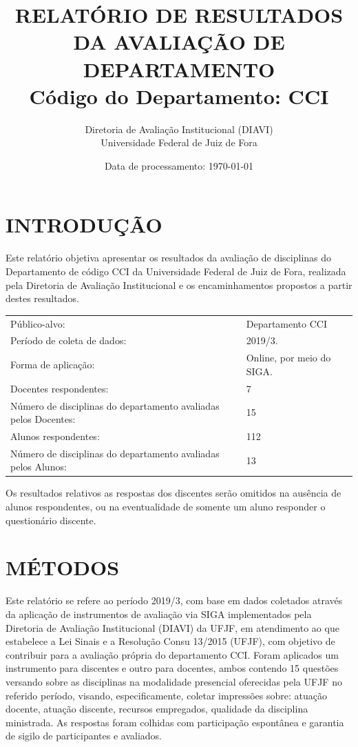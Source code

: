 \documentclass[a4paper,10pt]{article}
\date{Data de processamento: \today}
\begin{document}
\author{Diretoria de Avaliação Institucional (DIAVI) \\ Universidade Federal de Juiz de Fora}

\title{RELATÓRIO DE RESULTADOS DA AVALIAÇÃO DE DEPARTAMENTO\\ Código do Departamento: CCI}
\maketitle
\section{INTRODUÇÃO}
Este relatório objetiva apresentar os resultados da avaliação de disciplinas do Departamento     de código CCI da Universidade Federal de Juiz de Fora, realizada pela     Diretoria de Avaliação Institucional e os encaminhamentos propostos a     partir destes resultados.

\begin{center}
\begin{tabularx}{\linewidth}{X|l}

Público-alvo:& Departamento  CCI\\

Período de coleta de dados:& 2019/3.\\

Forma de aplicação:& Online, por meio do SIGA.\\

Docentes respondentes:& 7\\

Número de disciplinas do departamento avaliadas pelos Docentes:& 15\\

Alunos   respondentes:& 112\\

Número de disciplinas do departamento  avaliadas pelos   Alunos:& 13\\
\end{tabularx}
\end{center}

Os resultados relativos as respostas dos discentes serão omitidos na ausência de alunos respondentes, ou na eventualidade de somente um aluno responder o questionário discente.
\section{MÉTODOS}
Este relatório se refere ao período 2019/3, com base em dados     coletados através da aplicação de instrumentos de avaliação via SIGA     implementados pela Diretoria de Avaliação Institucional (DIAVI) da UFJF, em atendimento     ao que estabelece a Lei Sinais e a Resolução Consu 13/2015 (UFJF),     com objetivo de contribuir para a avaliação própria do departamento CCI.    Foram aplicados um instrumento para discentes e outro para docentes, ambos contendo     15 questões versando sobre as disciplinas na modalidade presencial oferecidas pela UFJF no     referido período, visando, especificamente, coletar impressões sobre: atuação docente, atuação discente,     recursos empregados, qualidade da disciplina ministrada.     As respostas foram colhidas      com participação espontânea e garantia de    sigilo de participantes e avaliados.
\end{document}
